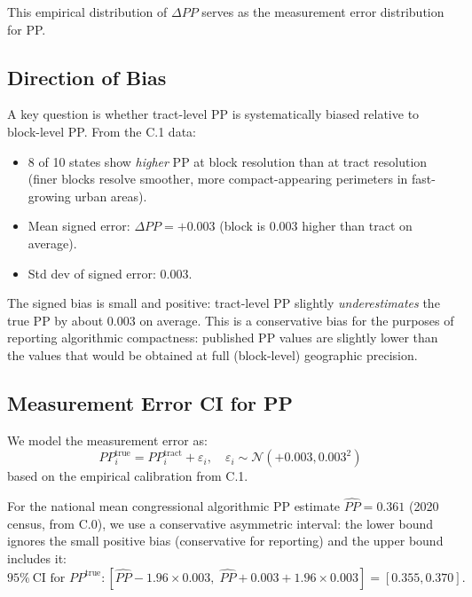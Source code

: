 This empirical distribution of $\Delta PP$ serves as the measurement
error distribution for PP.

\subsection{Direction of Bias}

A key question is whether tract-level PP is systematically biased
relative to block-level PP. From the C.1 data:

\begin{itemize}
  \item 8 of 10 states show \emph{higher} PP at block resolution than
    at tract resolution (finer blocks resolve smoother, more
    compact-appearing perimeters in fast-growing urban areas).
  \item Mean signed error: $\Delta PP = +0.003$ (block is $0.003$
    higher than tract on average).
  \item Std dev of signed error: $0.003$.
\end{itemize}

The signed bias is small and positive: tract-level PP slightly
\emph{underestimates} the true PP by about $0.003$ on average.
This is a conservative bias for the purposes of reporting algorithmic
compactness: published PP values are slightly lower than the values
that would be obtained at full (block-level) geographic precision.

\subsection{Measurement Error CI for PP}

We model the measurement error as:
\begin{equation}
  PP_i^{\text{true}} = PP_i^{\text{tract}} + \varepsilon_i,
  \quad \varepsilon_i \sim \mathcal{N}(+0.003, 0.003^2)
\end{equation}
based on the empirical calibration from C.1.

For the national mean congressional algorithmic PP estimate
$\hat{PP} = 0.361$ (2020 census, from C.0), we use a conservative
asymmetric interval: the lower bound ignores the small positive bias
(conservative for reporting) and the upper bound includes it:
\begin{equation}
  95\%\ \text{CI for } PP^{\text{true}}:
  [\hat{PP} - 1.96 \times 0.003,\; \hat{PP} + 0.003 + 1.96 \times 0.003]
  = [0.355, 0.370].
\end{equation}

